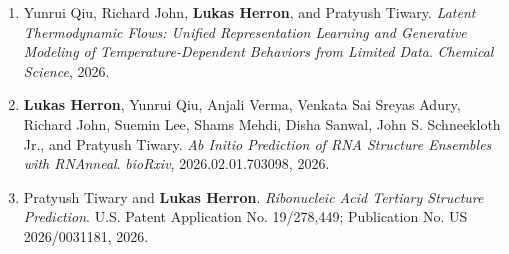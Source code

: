 {\begin{enumerate}
\item Yunrui Qiu, Richard John, \textbf{Lukas Herron}, and Pratyush Tiwary. \textit{Latent Thermodynamic Flows: Unified Representation Learning and Generative Modeling of Temperature-Dependent Behaviors from Limited Data}. \textit{Chemical Science}, 2026.
\item \textbf{Lukas Herron}, Yunrui Qiu, Anjali Verma, Venkata Sai Sreyas Adury, Richard John, Suemin Lee, Shams Mehdi, Disha Sanwal, John S. Schneekloth Jr., and Pratyush Tiwary. \textit{Ab Initio Prediction of RNA Structure Ensembles with RNAnneal}. \textit{bioRxiv}, 2026.02.01.703098, 2026.
\item Pratyush Tiwary and \textbf{Lukas Herron}. \textit{Ribonucleic Acid Tertiary Structure Prediction}. U.S. Patent Application No. 19/278,449; Publication No. US 2026/0031181, 2026.
\end{enumerate}
}
